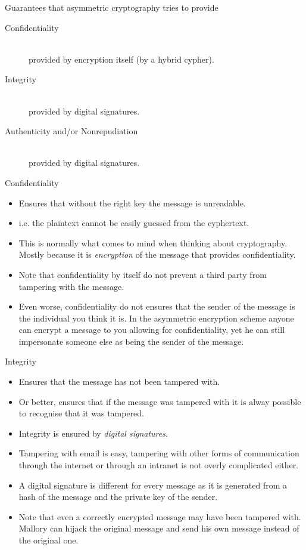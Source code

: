 \documentclass[hyperref={colorlinks=true}]{beamer}
\begin{document}
\begin{frame}{Guarantees that asymmetric cryptography tries to provide}
  \begin{description}
    \item[Confidentiality] \hfill \\
provided by encryption itself (by a hybrid cypher).
    \item[Integrity] \hfill \\
provided by digital signatures.
    \item[Authenticity and/or Nonrepudiation] \hfill \\
provided by digital signatures.
  \end{description}
\end{frame}

\begin{frame}{Confidentiality}
  \begin{itemize}
    \item Ensures that without the right key the message is unreadable.
    \item i.e. the plaintext cannot be easily guessed from the cyphertext.
    \item This is normally what comes to mind when thinking about cryptography.
Mostly because it is \emph{encryption} of the message that provides
confidentiality.
    \item Note that confidentiality by itself do not prevent a third party from
tampering with the message.
    \item Even worse, confidentiality do not ensures that the sender of the
message is the individual you think it is.  In the asymmetric encryption scheme
anyone can encrypt a message to you allowing for confidentiality, yet he can
still impersonate someone else as being the sender of the message.
  \end{itemize}
\end{frame}

\begin{frame}{Integrity}
  \begin{itemize}
    \item Ensures that the message has not been tampered with.
    \item Or better, ensures that if the message was tampered with it is alway
possible to recognise that it was tampered.
    \item Integrity is ensured by \emph{digital signatures}.
    \item Tampering with email is easy, tampering with other forms of
communication through the internet or through an intranet is not overly
complicated either.
    \item A digital signature is different for every message as it is generated
from a hash of the message and the private key of the sender.
    \item Note that even a correctly encrypted message may have been tampered
with.  Mallory can hijack the original message and send his own message instead
of the original one.
  \end{itemize}
\end{frame}
\end{document}
